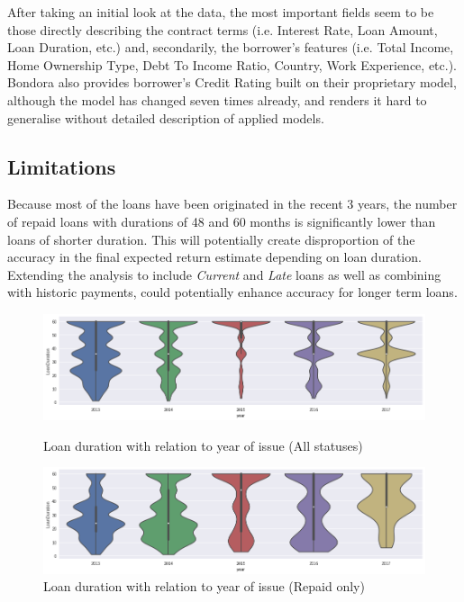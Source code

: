 \documentclass[preprint,12pt]{elsarticle}
\begin{document}
After taking an initial look at the data, the most important fields seem to be those directly describing the contract terms (i.e. Interest Rate, Loan Amount, Loan Duration, etc.) and, secondarily, the borrower's features (i.e. Total Income, Home Ownership Type, Debt To Income Ratio, Country, Work Experience, etc.). Bondora also provides borrower's Credit Rating built on their proprietary model, although the model has changed seven times already, and renders it hard to generalise without detailed description of applied models.

\subsection{Limitations}

Because most of the loans have been originated in the recent 3 years, the number of repaid loans with durations of 48 and 60 months is significantly lower than loans of shorter duration. This will potentially create disproportion of the accuracy in the final expected return estimate depending on loan duration. Extending the analysis to include \textit{Current} and \textit{Late} loans as well as combining with historic payments, could potentially enhance accuracy for longer term loans. 

\begin{figure}[h]
\centering\includegraphics[width=1.0\linewidth,height=0.25\textheight]{plots/loan_duration_vs_issue_year}
\caption{Loan duration with relation to year of issue (All statuses)}
\centering\includegraphics[width=1.0\linewidth,height=0.25\textheight]{plots/loan_duration_vs_issue_year_repaid}
\caption{Loan duration with relation to year of issue (Repaid only)}
\end{figure}
\end{document}
